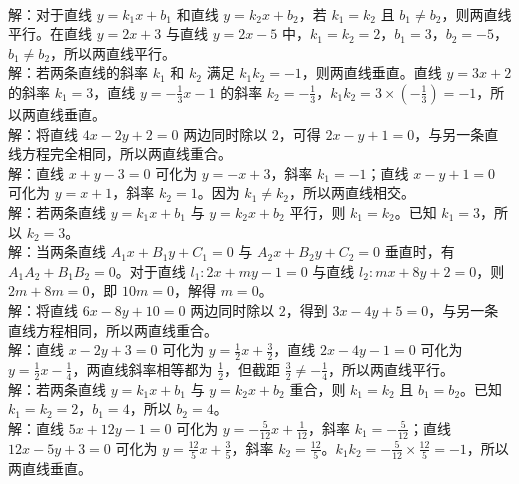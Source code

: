 \begin{MyAnswer}[ref={ex:line_position}]
    \Question {}\\ 解：对于直线 $y = k_1x + b_1$ 和直线 $y = k_2x + b_2$，若 $k_1 = k_2$ 且 $b_1\neq b_2$，则两直线平行。在直线 $y = 2x + 3$ 与直线 $y = 2x - 5$ 中，$k_1 = k_2 = 2$，$b_1 = 3$，$b_2=-5$，$b_1\neq b_2$，所以两直线平行。
    \Question {}\\ 解：若两条直线的斜率 $k_1$ 和 $k_2$ 满足 $k_1k_2=-1$，则两直线垂直。直线 $y = 3x + 2$ 的斜率 $k_1 = 3$，直线 $y=-\frac{1}{3}x - 1$ 的斜率 $k_2=-\frac{1}{3}$，$k_1k_2=3\times(-\frac{1}{3})=-1$，所以两直线垂直。
    \Question {}\\ 解：将直线 $4x - 2y + 2 = 0$ 两边同时除以 $2$，可得 $2x - y + 1 = 0$，与另一条直线方程完全相同，所以两直线重合。
    \Question {}\\ 解：直线 $x + y - 3 = 0$ 可化为 $y=-x + 3$，斜率 $k_1=-1$；直线 $x - y + 1 = 0$ 可化为 $y=x + 1$，斜率 $k_2 = 1$。因为 $k_1\neq k_2$，所以两直线相交。
    \Question {}\\ 解：若两条直线 $y = k_1x + b_1$ 与 $y = k_2x + b_2$ 平行，则 $k_1 = k_2$。已知 $k_1 = 3$，所以 $k_2 = 3$。
    \Question {}\\ 解：当两条直线 $A_1x + B_1y + C_1 = 0$ 与 $A_2x + B_2y + C_2 = 0$ 垂直时，有 $A_1A_2 + B_1B_2 = 0$。对于直线 $l_1:2x + my - 1 = 0$ 与直线 $l_2:mx + 8y + 2 = 0$，则 $2m+8m = 0$，即 $10m = 0$，解得 $m = 0$。
    \Question {}\\ 解：将直线 $6x - 8y + 10 = 0$ 两边同时除以 $2$，得到 $3x - 4y + 5 = 0$，与另一条直线方程相同，所以两直线重合。
    \Question {}\\ 解：直线 $x - 2y + 3 = 0$ 可化为 $y=\frac{1}{2}x+\frac{3}{2}$，直线 $2x - 4y - 1 = 0$ 可化为 $y=\frac{1}{2}x-\frac{1}{4}$，两直线斜率相等都为 $\frac{1}{2}$，但截距 $\frac{3}{2}\neq-\frac{1}{4}$，所以两直线平行。
    \Question {}\\ 解：若两条直线 $y = k_1x + b_1$ 与 $y = k_2x + b_2$ 重合，则 $k_1 = k_2$ 且 $b_1 = b_2$。已知 $k_1 = k_2 = 2$，$b_1 = 4$，所以 $b_2 = 4$。
    \Question {}\\ 解：直线 $5x + 12y - 1 = 0$ 可化为 $y=-\frac{5}{12}x+\frac{1}{12}$，斜率 $k_1=-\frac{5}{12}$；直线 $12x - 5y + 3 = 0$ 可化为 $y=\frac{12}{5}x+\frac{3}{5}$，斜率 $k_2=\frac{12}{5}$。$k_1k_2=-\frac{5}{12}\times\frac{12}{5}=-1$，所以两直线垂直。
\end{MyAnswer}










